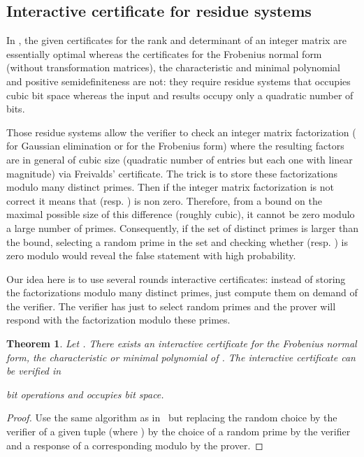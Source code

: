 \documentclass{article}
\newtheorem{theorem}{Theorem}
\newcommand{\psdness}{positive semidefiniteness\xspace}
\begin{document}
\subsection{Interactive certificate for residue systems}
In \cite[Theorem~5]{Kaltofen:2011:quadcert}, the given certificates for the rank
and determinant of an integer matrix are essentially optimal whereas the
certificates for the Frobenius normal form (without transformation matrices),
the characteristic and minimal polynomial and \psdness are not: they require
residue systems that occupies cubic bit space whereas the input and results
occupy only a quadratic number of bits.
 

Those residue systems allow the verifier to check an integer matrix
factorization 
( for Gaussian elimination or  for the Frobenius form) where
the resulting factors are in general of cubic size (quadratic number of entries
but each one with linear magnitude) via Freivalds' certificate.
The trick is to store these factorizations modulo many distinct primes.
Then if the integer matrix factorization is not correct it means that 
(resp. ) is non zero. 
Therefore, from a bound on the maximal possible size of this difference (roughly
cubic), it cannot be zero modulo a large number of primes. 
Consequently, if the set
of distinct primes is larger than the bound, selecting a random prime  in the
set and checking whether  (resp. ) is zero modulo  would
reveal the false statement with high probability.

Our idea here is to use several rounds interactive certificates: instead of
storing the factorizations modulo many distinct primes, just compute them on
demand of the verifier. The verifier has just to select random primes and the
prover will respond with the factorization modulo these primes.

\begin{theorem}\label{thm:RNS}
  Let . There exists an {\em interactive certificate} for the
  Frobenius normal form, the characteristic or minimal polynomial of . The
  interactive certificate can be verified in 
 
  bit operations
  and occupies  bit space.
\end{theorem}
\begin{proof}
  Use the same algorithm as in~\cite[Theorem 4]{Kaltofen:2011:quadcert} but
  replacing the random choice by the verifier of a given tuple 
  (where ) by the choice of a random prime  by the
  verifier  and a response of a corresponding  modulo  by the
  prover. 
\end{proof}
\end{document}
